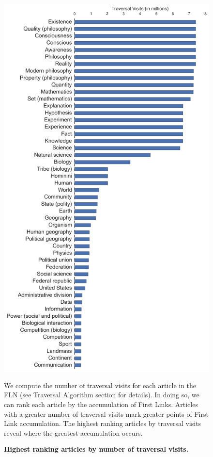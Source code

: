 \documentclass[pre,twocolumn,twoside,superscriptaddress,floatfix, aps, 10pt]{revtex4-1}
\begin{document}
\begin{figure}[tp!]
  \centering	
  \includegraphics[width=\columnwidth]{graphics/articles_ranked.png}
  \caption{
    \textbf{Highest ranking articles by number of traversal visits.}
  }
  We compute the number of traversal visits for each article in the FLN (see 
  Traversal Algorithm section for details). In doing so, we can rank each article
  by the accumulation of First Links. Articles with a greater number of traversal visits
  mark greater points of First Link accumulation. The highest ranking articles by traversal visits reveal where the greatest accumulation occurs.
  \label{fig:highest visits}
\end{figure}
\end{document}
